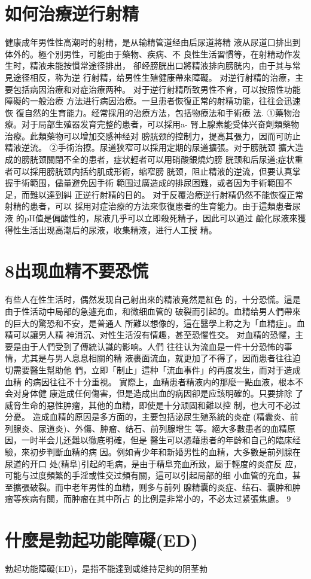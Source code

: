 \documentclass[12pt,UTF8]{ctexbook}
\begin{document}
\section{如何治療逆行射精}
健康成年男性性高潮时的射精，是从输精管道经由后尿道將精
液从尿道口排出到体外的。極个別男性，可能由于藥物、疾病、不
良性生活習慣等，在射精动作发生时，精液未能按慣常途径排出，
卻经膀胱出口將精液排向膀胱内，由于其与常見途径相反，称为逆
行射精，给男性生殖健康帶來障礙。
对逆行射精的治療，主要包括病因治療和对症治療两种。
对于逆行射精所致男性不育，可以按照性功能障礙的一般治療
方法进行病因治療。一旦患者恢復正常的射精功能，往往会迅速恢
復自然的生育能力。经常採用的治療方法，包括物療法和手術療
法.
①藥物治療。对于局部生殖器发育完整的患者，可以採用a-
腎上腺素能受体兴奋劑類藥物治療。此類藥物可以增加交感神经对
膀胱颈的控制力，提高其張力，因而可防止精液逆流。
②手術治撩。尿道狭窄可以採用定期的尿道擴張。对于膀胱颈
擴大造成的膀胱颈關閉不全的患者，症状輕者可以用硝酸銀燒灼膀
胱颈和后尿道;症状重者可以採用膀胱颈内括约肌成形術，缩窄膀
胱颈，阻止精液的逆流，但要认真掌握手術範围，儘量避免因手術
範围过廣造成的排尿困難，或者因为手術範围不足，而難以達到糾
正逆行射精的目的。
对于反覆治療逆行射精仍然不能恢復正常射精的患者，可以
採用对症治療的方法來恢復患者的生育能力。由于這類患者尿液
的pH值是偏酸性的，尿液几乎可以立即殺死精子，因此可以通过
鹼化尿液來獲得性生活出现高潮后的尿液，收集精液，进行人工授
精。
\section{8出现血精不要恐慌}
有些人在性生活时，偶然发现自己射出來的精液竟然是紅色
的，十分恐慌。這是由于性活动中局部的急遽充血，和微细血管的
破裂而引起的。血精给男人們帶來的巨大的驚恐和不安，是普通人
所難以想像的，這在醫學上称之为「血精症」。血精可以讓男人精
神消沉、对性生活沒有情趣，甚至恐懼性交。
对血精的恐懼，主要是由于人們受到了傳統认識的影响。人們
往往认为流血是一件十分恐怖的事情，尤其是与男人息息相關的精
液裹面流血，就更加了不得了，因而患者往往迫切需要醫生幫助他
們，立即「制止」這种「流血事件」的再度发生，而对于造成血精
的病因往往不十分重視。
實際上，血精患者精液内的那麼一點血液，根本不会对身体健
康造成任何傷害，但是造成出血的病因卻是应該明確的。只要排除
了威脅生命的惡性肿瘤，其他的血精，即使是十分顽固和難以控
制，也大可不必过分憂。
造成血精的原因是多方面的，主要包括泌尿生殖系統的炎症
(精囊炎、前列腺炎、尿道炎)、外傷、肿瘤、结石、前列腺增生
等。絕大多數患者的血精原因，一时半会儿还難以徹底明確，但是
醫生可以憑藉患者的年龄和自己的臨床经驗，來初步判斷血精的病
因。例如青少年和新婚男性的血精，大多數是前列腺在尿道的开口
处(精阜)引起的毛病，是由于精阜充血所致，屬于輕度的炎症反
应，可能与过度頻繁的手淫或性交过頻有關，這可以引起局部的细
小血管的充血，甚至擴張破裂。而中老年男性的血精，则多与前列
腺精囊的炎症、结石、囊肿和肿瘤等疾病有關，而肿瘤在其中所占
的比例是非常小的，不必太过紧張焦慮。
9\section{什麼是勃起功能障礙(ED)}
勃起功能障礙(ED)，是指不能達到或维持足夠的阴茎勃
\end{document}
